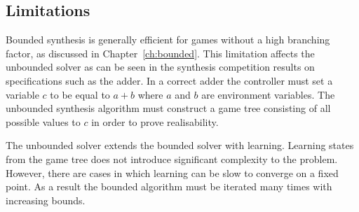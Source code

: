 \subsection{Limitations}

Bounded synthesis is generally efficient for games without a high branching factor, as discussed in Chapter~\ref{ch:bounded}. This limitation affects the unbounded solver as can be seen in the synthesis competition results on specifications such as the adder. In a correct adder the controller must set a variable $c$ to be equal to $a + b$ where $a$ and $b$ are environment variables. The unbounded synthesis algorithm must construct a game tree consisting of all possible values to $c$ in order to prove realisability.

The unbounded solver extends the bounded solver with learning. Learning states from the game tree does not introduce significant complexity to the problem. However, there are cases in which learning can be slow to converge on a fixed point. As a result the bounded algorithm must be iterated many times with increasing bounds.

